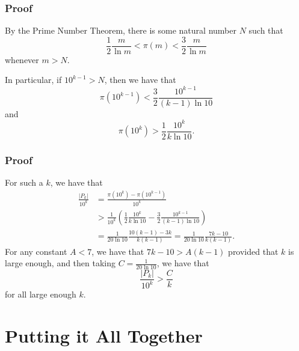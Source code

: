 \documentclass{beamer}
\begin{document}
\begin{frame}
    \frametitle{Proof}

    By the Prime Number Theorem, there is some natural number $N$ such that
    \[
        \frac{1}{2} \frac{m}{\ln m} < \pi(m) < \frac{3}{2} \frac{m}{\ln m}    
    \]
    whenever $m > N$.

    In particular, if $10^{k - 1} > N$, then we have that
    \[
        \pi\left( 10^{k - 1} \right) < \frac{3}{2} \frac{10^{k - 1}}{(k - 1) \ln 10}
    \]
    and
    \[
        \pi\left( 10^k \right) > \frac{1}{2} \frac{10^k}{k \ln 10}.
    \]

\end{frame}

\begin{frame}
    \frametitle{Proof}

    For such a $k$, we have that
    \begin{align*}
        \frac{\left| P_k \right|}{10^{k}} & = \frac{\pi\left( 10^{k} \right) - \pi\left( 10^{k - 1} \right)}{10^{k}} \\
        & > \frac{1}{10^k} \left( \frac{1}{2} \frac{10^k}{k \ln 10} - \frac{3}{2} \frac{10^{k - 1}}{(k - 1) \ln 10} \right) \\
        & = \frac{1}{20 \ln 10}\frac{10(k - 1) - 3k}{k(k - 1)} = \frac{1}{20 \ln 10} \frac{7k - 10}{k(k - 1)}.
    \end{align*}
    \pause
    For any constant $A < 7$, we have that $7k - 10 > A(k - 1)$ provided that $k$ is large enough, and then taking $C = \frac{1}{20 \ln 10}$, we have that
    \[
        \frac{\left| P_k \right|}{10^{k}} > \frac{C}{k}
    \]
    for all large enough $k$.

\end{frame}

\section{Putting it All Together}
\end{document}
